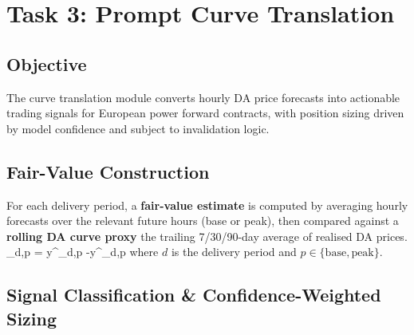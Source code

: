 \documentclass[11pt,a4paper]{article}
\begin{document}
\section{Task 3: Prompt Curve Translation}
\label{sec:task3}

\subsection{Objective}
The curve translation module converts hourly DA price forecasts into actionable trading signals for European power forward contracts, with position sizing driven by model confidence and subject to invalidation logic.

\subsection{Fair-Value Construction}
For each delivery period, a \textbf{fair-value estimate} is computed by averaging hourly forecasts over the relevant future hours (base or peak), then compared against a \textbf{rolling DA curve proxy} the trailing 7/30/90-day average of realised DA prices.
  \_{d,p} = y\^{}\_{d,p} -y\^{}\_{d,p}
where $d$ is the delivery period and $p \in \{\text{base}, \text{peak}\}$.

\subsection{Signal Classification \& Confidence-Weighted Sizing}
\end{document}
